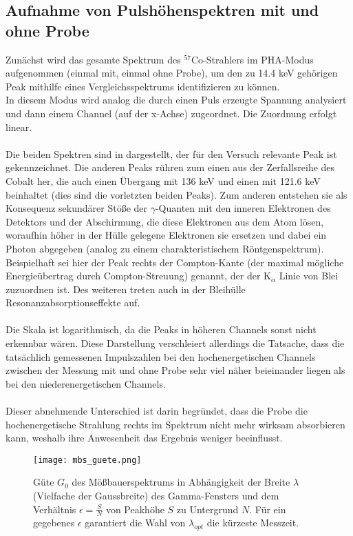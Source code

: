 \documentclass[german,  %
parskip=full,  %
headsepline]{scrartcl}
\newcommand{\bcref}[1]{\namecref{#1} \textcolor{blue}{\labelcref{#1}}}
\begin{document}
\subsection{Aufnahme von Pulshöhenspektren mit und ohne Probe}
Zunächst wird das gesamte Spektrum des $^{57}$Co-Strahlers im PHA-Modus aufgenommen (einmal mit, einmal ohne Probe), um den zu 14.4 keV gehörigen Peak mithilfe eines Vergleichsspektrums identifizieren zu können. 
\\In diesem Modus wird analog die durch einen Puls erzeugte Spannung analysiert und dann einem Channel (auf der x-Achse) zugeordnet. Die Zuordnung erfolgt linear. 
\\\\Die beiden Spektren sind in \bcref{fig:full_Spec} dargestellt, der für den Versuch relevante Peak ist gekennzeichnet. Die anderen Peaks rühren zum einen aus der Zerfallsreihe des Cobalt her, die auch einen Übergang mit 136 keV und einen mit 121.6 keV beinhaltet (dies sind die vorletzten beiden Peaks). Zum anderen entstehen sie als Konsequenz sekundärer Stöße der $\gamma$-Quanten mit den inneren Elektronen des Detektors und der Abschirmung, die diese Elektronen aus dem Atom lösen, woraufhin höher in der Hülle gelegene Elektronen sie ersetzen und dabei ein Photon abgegeben (analog zu einem charakteristischem Röntgenspektrum). Beispielhaft sei hier der Peak rechts der Compton-Kante (der maximal mögliche Energieübertrag durch Compton-Streuung) genannt, der der K$_{\alpha}$ Linie von Blei zuzuordnen ist. Des weiteren treten auch in der Bleihülle Resonanzabsorptionseffekte auf.
\\\\Die Skala ist logarithmisch, da die Peaks in höheren Channels sonst nicht erkennbar wären. Diese Darstellung verschleiert allerdings die Tatsache, dass die tatsächlich gemessenen Impulszahlen bei den hochenergetischen Channels zwischen der Messung mit und ohne Probe sehr viel näher beieinander liegen als bei den niederenergetischen Channels. \\\\Dieser abnehmende Unterschied ist darin begründet, dass die Probe die hochenergetische Strahlung rechts im Spektrum nicht mehr wirksam absorbieren kann, weshalb ihre Anwesenheit das Ergebnis weniger beeinflusst.\\%
\begin{figure}[htp!]
    \centering
    \texttt{[image: mbs\_guete.png]}
    \caption{Güte $G_0$ des Mößbauerspektrums in Abhängigkeit der Breite $\lambda$ (Vielfache der Gaussbreite) des Gamma-Fensters und dem Verhältnis $\epsilon=\frac{S}{N}$ von Peakhöhe $S$ zu Untergrund $N$. Für ein gegebenes $\epsilon$ garantiert die Wahl von $\lambda_{opt}$ die kürzeste Messzeit.}
    \label{fig:guete}
\end{figure}
\end{document}
